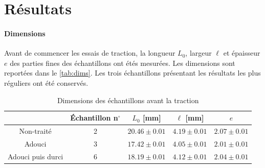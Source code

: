 \section{Résultats}

\paragraph{Dimensions} Avant de commencer les essais de traction, la longueur \(L_0\), largeur \(\ell\) et épaisseur \(e\) des parties fines des échantillons ont étés mesurées. Les dimensions sont reportées dans le \autoref{tab:dims}. Les trois échantillons présentant les résultats les plus réguliers ont été conservés.

\begin{table}[h]
    \centering
    \begin{tabular}{ |c||c|c|c|c| }
        \cline{2-5}
        \multicolumn{1}{c|}{} & Échantillon n$^\circ$ & \(L_0\) [mm] & \(\ell\) [mm] & \(e\) \\
        \hline
        \multirow{1}{4cm}{Non-traité}
        & 2 & \(20.46 \pm 0.01\) & \(4.19 \pm 0.01\) & \(2.07 \pm 0.01\) \\
        \hline
        \multirow{1}{4cm}{Adouci}
        & 3 & \(17.42 \pm 0.01\) & \(4.05 \pm 0.01\) & \(2.01 \pm 0.01\) \\
        \hline
        \multirow{1}{4cm}{Adouci puis durci}
        & 6 & \(18.19 \pm 0.01\) & \(4.12 \pm 0.01\) & \(2.04 \pm 0.01\) \\
        \hline
    \end{tabular}
    \caption{Dimensions des échantillons avant la traction}
    \label{tab:dims}
\end{table}

